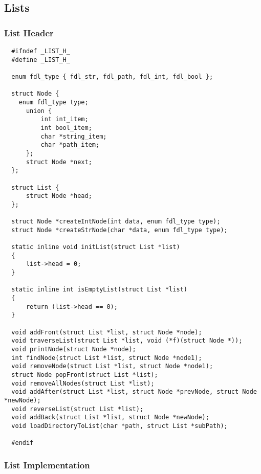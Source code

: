 \documentclass[11pt]{article}
\begin{document}
\newpage

\subsection{Lists}

\subsubsection{List Header}

\begin{listing}[H]
  \begin{verbatim}
  #ifndef _LIST_H_
  #define _LIST_H_

  enum fdl_type { fdl_str, fdl_path, fdl_int, fdl_bool };

  struct Node {
    enum fdl_type type;
      union {
          int int_item;
          int bool_item;
          char *string_item;
          char *path_item;
      };
      struct Node *next;
  };

  struct List {
      struct Node *head;
  };

  struct Node *createIntNode(int data, enum fdl_type type);
  struct Node *createStrNode(char *data, enum fdl_type type);

  static inline void initList(struct List *list)
  {
      list->head = 0;
  }

  static inline int isEmptyList(struct List *list)
  {
      return (list->head == 0);
  }

  void addFront(struct List *list, struct Node *node);
  void traverseList(struct List *list, void (*f)(struct Node *));
  void printNode(struct Node *node);
  int findNode(struct List *list, struct Node *node1);
  void removeNode(struct List *list, struct Node *node1);
  struct Node popFront(struct List *list);
  void removeAllNodes(struct List *list);
  void addAfter(struct List *list, struct Node *prevNode, struct Node *newNode);
  void reverseList(struct List *list);
  void addBack(struct List *list, struct Node *newNode);
  void loadDirectoryToList(char *path, struct List *subPath);

  #endif

  \end{verbatim}
\end{listing}

\newpage

\subsubsection{List Implementation}
\end{document}
